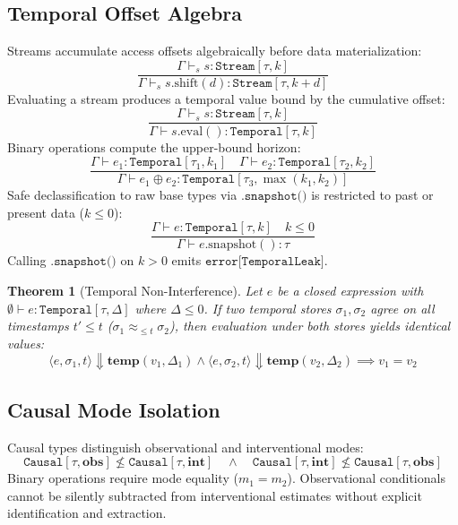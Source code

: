 \documentclass[11pt,twocolumn]{article}
\newtheorem{theorem}{Theorem}
\begin{document}
\subsection{Temporal Offset Algebra}
Streams accumulate access offsets algebraically before data materialization:
\begin{equation}
\frac{\Gamma \vdash_s s : \texttt{Stream}[\tau, k]}{\Gamma \vdash_s s.\text{shift}(d) : \texttt{Stream}[\tau, k+d]}
\end{equation}
Evaluating a stream produces a temporal value bound by the cumulative offset:
\begin{equation}
\frac{\Gamma \vdash_s s : \texttt{Stream}[\tau, k]}{\Gamma \vdash s.\text{eval}() : \texttt{Temporal}[\tau, k]}
\end{equation}
Binary operations compute the upper-bound horizon:
\begin{equation}
\frac{\Gamma \vdash e_1 : \texttt{Temporal}[\tau_1, k_1] \quad \Gamma \vdash e_2 : \texttt{Temporal}[\tau_2, k_2]}{\Gamma \vdash e_1 \oplus e_2 : \texttt{Temporal}[\tau_3, \max(k_1, k_2)]}
\end{equation}
Safe declassification to raw base types via $\texttt{.snapshot()}$ is restricted to past or present data ($k \le 0$):
\begin{equation}
\frac{\Gamma \vdash e : \texttt{Temporal}[\tau, k] \quad k \le 0}{\Gamma \vdash e.\text{snapshot}() : \tau}
\end{equation}
Calling $\texttt{.snapshot()}$ on $k > 0$ emits $\texttt{error[TemporalLeak]}$.

\begin{theorem}[Temporal Non-Interference]
Let $e$ be a closed expression with $\emptyset \vdash e : \texttt{Temporal}[\tau, \Delta]$ where $\Delta \le 0$. If two temporal stores $\sigma_1, \sigma_2$ agree on all timestamps $t' \le t$ ($\sigma_1 \approx_{\le t} \sigma_2$), then evaluation under both stores yields identical values:
\[
\langle e, \sigma_1, t \rangle \Downarrow \mathbf{temp}(v_1, \Delta_1) \land \langle e, \sigma_2, t \rangle \Downarrow \mathbf{temp}(v_2, \Delta_2) \implies v_1 = v_2
\]
\end{theorem}

\subsection{Causal Mode Isolation}
Causal types distinguish observational and interventional modes:
\[
\texttt{Causal}[\tau, \mathbf{obs}] \not\le \texttt{Causal}[\tau, \mathbf{int}] \quad \land \quad \texttt{Causal}[\tau, \mathbf{int}] \not\le \texttt{Causal}[\tau, \mathbf{obs}]
\]
Binary operations require mode equality ($m_1 = m_2$). Observational conditionals cannot be silently subtracted from interventional estimates without explicit identification and extraction.
\end{document}

